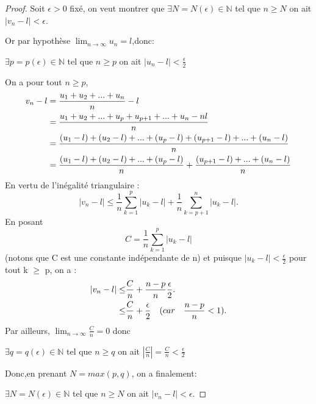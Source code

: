 \documentclass[12pt]{book}
\theoremstyle{definition}\newtheorem{dfn}{Définition}[chapter]
\theoremstyle{plain}\newtheorem{thm}{Théorème}[chapter]
\theoremstyle{plain}\newtheorem{prp}{Proposition}[chapter]
\theoremstyle{plain}\newtheorem{lem}{\bf Lemme}[chapter]
\theoremstyle{plain}\newtheorem{axm}{\bf Axiome}[chapter]
\theoremstyle{plain}\newtheorem{lmm}{\bf Lemme}[chapter]
\theoremstyle{plain}\newtheorem{exm}{\bf Example}[chapter]
\theoremstyle{plain}\newtheorem{cor}{\bf Corollaire}[chapter]
\theoremstyle{remark}\newtheorem{rem}{Remarque}[chapter]
\begin{document}
\begin{proof}
        Soit $\epsilon > 0$ fixé, on veut montrer que $ \exists N=N(\epsilon) \in \mathbb{N} $ tel que $n\ge N$ on ait $|v_n-l| < \epsilon$.

        Or par hypothèse $\lim_{n \rightarrow \infty} u_n = l $,donc:

        $ \exists p=p(\epsilon) \in \mathbb{N} $ tel que $n\ge p$ on ait $|u_n-l| < \frac{\epsilon}{2}$

        On a pour tout $n\ge p$,
        \begin{align}
        v_n-l ={} & \frac{u_1+u_2+...+u_n}{n}-l \notag \\
        ={} & \frac{u_1+u_2+...+u_p+u_{p+1}+...+u_n-nl}{n} \notag \\
        ={} & \frac{(u_1-l)+(u_2-l)+...+(u_p-l)+(u_{p+1}-l)+...+(u_n-l)}{n}  \notag \\
        ={} & \frac{(u_1-l)+(u_2-l)+...+(u_p-l)}{n}+\frac{(u_{p+1}-l)+...+(u_n-l)}{n}  \notag
        \end{align}
        En vertu de l'inégalité triangulaire :
        $$|v_n-l| \le \frac{1}{n}\sum_{k=1}^{p}|u_k-l| + \frac{1}{n}\sum_{k=p+1}^{n}|u_k-l|.
        $$
        En posant
        $$C=\frac{1}{n}\sum_{k=1}^{p}|u_k-l|$$
        (notons que C est une constante indépendante de n) et puisque $|u_k-l|< \frac{\epsilon}{2}$
        pour tout k $\ge$ p, on a :
        \begin{align}
        |v_n-l| \le & \frac{C}{n} + \frac{n-p}{n}\frac{\epsilon}{2}. \notag \\
              \le & \frac{C}{n} + \frac{\epsilon}{2}\quad(car\quad \frac{n-p}{n} < 1). \notag
        \end{align}
        Par ailleurs, $\lim_{n\rightarrow \infty}\frac{C}{n}=0$ donc

$ \exists q=q(\epsilon) \in \mathbb{N} $ tel que $n\ge q$ on ait $|\frac{C}{n}|=\frac{C}{n} < \frac{\epsilon}{2}$

Donc,en prenant $N=max(p,q)$, on a finalement:

$ \exists N=N(\epsilon) \in \mathbb{N} $ tel que $n\ge N$ on ait $|v_n-l| < \epsilon$.

\end{proof}

\end{document}
